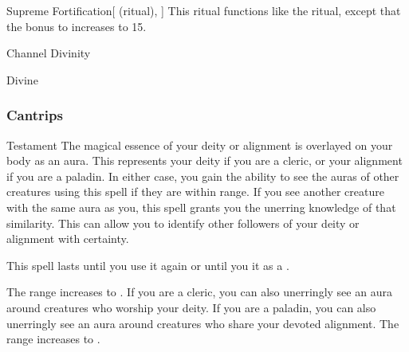 \lowercase{\hypertarget{spell:Supreme Fortification}{}}\label{spell:Supreme Fortification}
\begin{attuneability}[Rank 7]{\hypertarget{spell:Supreme Fortification}{Supreme Fortification}}[ (ritual), ]
This ritual functions like the  ritual, except that the bonus to  increases to 15.
\end{attuneability}
\vspace{0.25em}


\newpage
\begin{spellsection}{Channel Divinity}

\begin{spellheader}
\end{spellheader}


 Divine

\subsubsection{Cantrips}


\begin{freeability}{Testament}
The magical essence of your deity or alignment is overlayed on your body as an aura.
This represents your deity if you are a cleric, or your alignment if you are a paladin.
In either case, you gain the ability to see the auras of other creatures using this spell if they are within \rngclose range.
If you see another creature with the same aura as you, this spell grants you the unerring knowledge of that similarity.
This can allow you to identify other followers of your deity or alignment with certainty.

This spell lasts until you use it again or until you  it as a .

\rankline
{} The range increases to \rngmed.
 If you are a cleric, you can also unerringly see an aura around creatures who worship your deity.
If you are a paladin, you can also unerringly see an aura around creatures who share your devoted alignment.
 The range increases to \rngext.
\end{freeability}

\end{spellsection}



